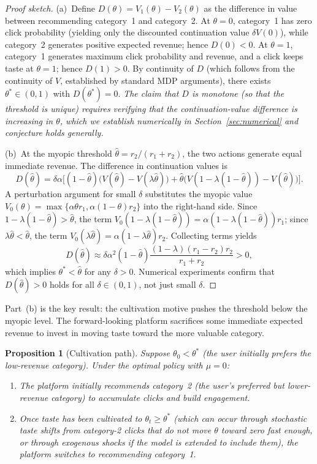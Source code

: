 \documentclass[11pt]{article}
\newtheorem{proposition}{Proposition}
\begin{document}
\begin{proof}[Proof sketch]
(a)~Define $D(\theta) = V_1(\theta) - V_2(\theta)$ as the difference in value between recommending category~1 and category~2. At $\theta = 0$, category~1 has zero click probability (yielding only the discounted continuation value $\delta V(0)$), while category~2 generates positive expected revenue; hence $D(0) < 0$. At $\theta = 1$, category~1 generates maximum click probability and revenue, and a click keeps taste at $\theta = 1$; hence $D(1) > 0$. By continuity of $D$ (which follows from the continuity of $V$, established by standard MDP arguments), there exists $\theta^* \in (0,1)$ with $D(\theta^*) = 0$. \emph{The claim that $D$ is monotone (so that the threshold is unique) requires verifying that the continuation-value difference is increasing in $\theta$, which we establish numerically in Section~\ref{sec:numerical} and conjecture holds generally.}

(b)~At the myopic threshold $\hat{\theta} = r_2/(r_1+r_2)$, the two actions generate equal immediate revenue. The difference in continuation values is
\[
D(\hat{\theta}) = \delta\alpha\bigl[(1-\hat{\theta})\bigl(V(\hat{\theta}) - V(\lambda\hat{\theta})\bigr) + \hat{\theta}\bigl(V(1-\lambda(1-\hat{\theta})) - V(\hat{\theta})\bigr)\bigr].
\]
A perturbation argument for small $\delta$ substitutes the myopic value $V_0(\theta) = \max\{\alpha\theta r_1, \alpha(1-\theta) r_2\}$ into the right-hand side. Since $1-\lambda(1-\hat{\theta}) > \hat{\theta}$, the term $V_0(1-\lambda(1-\hat{\theta})) = \alpha(1-\lambda(1-\hat{\theta})) r_1$; since $\lambda\hat{\theta} < \hat{\theta}$, the term $V_0(\lambda\hat{\theta}) = \alpha(1-\lambda\hat{\theta})r_2$. Collecting terms yields
\[
D(\hat{\theta}) \approx \delta\alpha^2 (1-\hat{\theta})\frac{(1-\lambda)(r_1-r_2) r_2}{r_1+r_2} > 0,
\]
which implies $\theta^* < \hat{\theta}$ for any $\delta > 0$. Numerical experiments confirm that $D(\hat{\theta}) > 0$ holds for all $\delta \in (0,1)$, not just small $\delta$.
\end{proof}

Part~(b) is the key result: the cultivation motive pushes the threshold below the myopic level. The forward-looking platform sacrifices some immediate expected revenue to invest in moving taste toward the more valuable category.

\begin{proposition}[Cultivation path]\label{prop:path}
Suppose $\theta_0 < \theta^*$ (the user initially prefers the low-revenue category). Under the optimal policy with $\mu = 0$:
\begin{enumerate}[label=(\alph*)]
\item The platform initially recommends category~2 (the user's preferred but lower-revenue category) to accumulate clicks and build engagement.
\item Once taste has been cultivated to $\theta_t \ge \theta^*$ (which can occur through stochastic taste shifts from category-2 clicks that do not move $\theta$ toward zero fast enough, or through exogenous shocks if the model is extended to include them), the platform switches to recommending category~1.
\end{enumerate}
\end{proposition}
\end{document}
